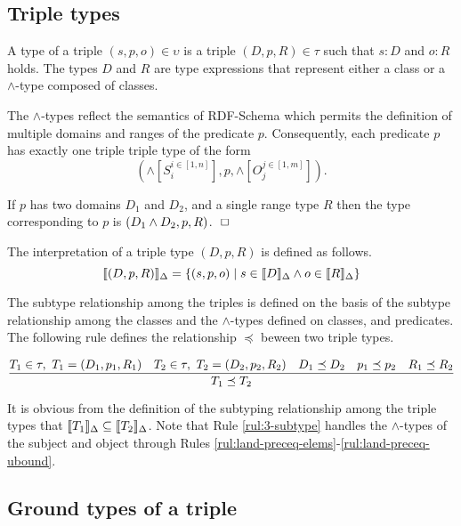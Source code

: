 \documentclass[runningheads]{llncs}
\newcommand{\llb}{\llbracket}
\newcommand{\rrb}{\rrbracket}
\newcommand{\finbox}{\phantom{.}\hfill\Box}
\begin{document}
\subsection{Triple types\label{sec:3-types}}

A type of a triple $(s,p,o)\in\upsilon$ is a triple
$(D,p,R)\in\tau$ such that $s:D$ and $o:R$ holds. The types
$D$ and $R$ are type expressions that represent either a class or
a $\land$-type composed of classes.

The $\land$-types reflect the semantics of RDF-Schema \cite{rdfschema}
which permits the definition of multiple domains and ranges of the
predicate $p$. Consequently, each predicate $p$ has exactly one triple
triple type of the form
$$(\land[S_i^{i\in[1,n]}],p,\land[O_j^{j\in[1,m]}]).$$

\begin{example}
  If $p$ has two domains $D_1$ and $D_2$, and a single
range type $R$ then the type corresponding to $p$ is
$(D_1\land\/D_2,p,R)$. $\finbox$
\end{example}

\noindent
The interpretation of a triple type $(D,p,R)$ is defined as
follows.
$$\llb(D,p,R)\rrb_\Delta=\{(s,p,o)\mid\/s\in\llb\/D\rrb_\Delta\land\/o\in\llb\/R\rrb_\Delta \}$$

The subtype relationship among the triples is defined on the basis of
the subtype relationship among the classes and the $\land$-types
defined on classes, and predicates. The following rule defines the
relationship $\preceq$ beween two triple types.

\begin{equation}
\label{rul:3-subtype}
\dfrac{T_1\in\tau,\ T_1=(D_1,p_1,R_1)\quad T_2\in\tau,\ T_2=(D_2,p_2,R_2)\quad\/D_1\preceq\/D_2\quad\/p_1\preceq\/p_2\quad\/R_1\preceq\/R_2}
      {T_1\preceq\/T_2}
\end{equation}

It is obvious from the definition of the subtyping relationship among
the triple types that
$\llb\/T_1\rrb_\Delta\subseteq\llb\/T_2\rrb_\Delta$. Note that Rule
\ref{rul:3-subtype} handles the $\land$-types of the subject and
object through Rules
\ref{rul:land-preceq-elems}-\ref{rul:land-preceq-ubound}.







\subsection{Ground types of a triple\label{sec:3-ground-types}}
\end{document}
